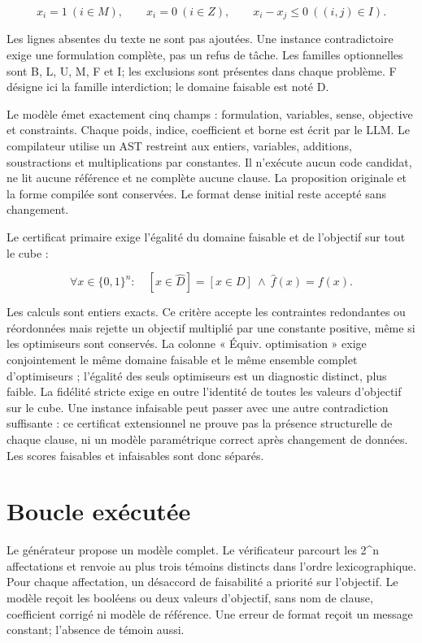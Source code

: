 \documentclass[11pt]{article}
\begin{document}
\[x_i=1\ (i\in M),\qquad x_i=0\ (i\in Z),\qquad x_i-x_j\leq0\ ((i,j)\in I).\]

Les lignes absentes du texte ne sont pas ajoutées. Une instance contradictoire exige une formulation complète, pas un refus de tâche. Les familles optionnelles sont B, L, U, M, F et I; les exclusions sont présentes dans chaque problème. F désigne ici la famille interdiction; le domaine faisable est noté D.

Le modèle émet exactement cinq champs : formulation, variables, sense, objective et constraints. Chaque poids, indice, coefficient et borne est écrit par le LLM. Le compilateur utilise un AST restreint aux entiers, variables, additions, soustractions et multiplications par constantes. Il n'exécute aucun code candidat, ne lit aucune référence et ne complète aucune clause. La proposition originale et la forme compilée sont conservées. Le format dense initial reste accepté sans changement.

Le certificat primaire exige l'égalité du domaine faisable et de l'objectif sur tout le cube :

\[\forall x\in\{0,1\}^n:\quad [x\in\widehat D]=[x\in D]\ \land\ \widehat f(x)=f(x).\]

Les calculs sont entiers exacts. Ce critère accepte les contraintes redondantes ou réordonnées mais rejette un objectif multiplié par une constante positive, même si les optimiseurs sont conservés. La colonne « Équiv. optimisation » exige conjointement le même domaine faisable et le même ensemble complet d'optimiseurs ; l'égalité des seuls optimiseurs est un diagnostic distinct, plus faible. La fidélité stricte exige en outre l'identité de toutes les valeurs d'objectif sur le cube. Une instance infaisable peut passer avec une autre contradiction suffisante : ce certificat extensionnel ne prouve pas la présence structurelle de chaque clause, ni un modèle paramétrique correct après changement de données. Les scores faisables et infaisables sont donc séparés.

\section{Boucle exécutée}

Le générateur propose un modèle complet. Le vérificateur parcourt les 2\textasciicircum{}n affectations et renvoie au plus trois témoins distincts dans l'ordre lexicographique. Pour chaque affectation, un désaccord de faisabilité a priorité sur l'objectif. Le modèle reçoit les booléens ou deux valeurs d'objectif, sans nom de clause, coefficient corrigé ni modèle de référence. Une erreur de format reçoit un message constant; l'absence de témoin aussi.
\end{document}
